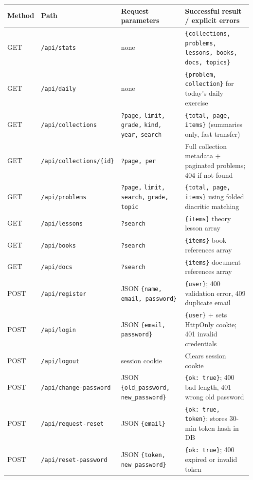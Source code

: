 \begin{table}[ht]
\centering\footnotesize
\begin{tabularx}{\textwidth}{@{}l l >{\raggedright\arraybackslash}X >{\raggedright\arraybackslash}X@{}}
\toprule
\textbf{Method} & \textbf{Path} & \textbf{Request parameters} & \textbf{Successful result / explicit errors}\\
\midrule
GET & \texttt{/api/stats} & none & \texttt{\{collections, problems, lessons, books, docs, topics\}}\\
GET & \texttt{/api/daily} & none & \texttt{\{problem, collection\}} for today's daily exercise\\
GET & \texttt{/api/collections} & \texttt{?page,} \texttt{limit,} \texttt{grade,} \texttt{kind,} \texttt{year,} \texttt{search} & \texttt{\{total, page, items\}} (summaries only, fast transfer)\\
GET & \texttt{/api/collections/\{id\}} & \texttt{?page, per} & Full collection metadata + paginated problems; 404 if not found\\
GET & \texttt{/api/problems} & \texttt{?page,} \texttt{limit,} \texttt{search,} \texttt{grade,} \texttt{topic} & \texttt{\{total, page, items\}} using folded diacritic matching\\
GET & \texttt{/api/lessons} & \texttt{?search} & \texttt{\{items\}} theory lesson array\\
GET & \texttt{/api/books} & \texttt{?search} & \texttt{\{items\}} book references array\\
GET & \texttt{/api/docs} & \texttt{?search} & \texttt{\{items\}} document references array\\
POST & \texttt{/api/register} & JSON \texttt{\{name, email, password\}} & \texttt{\{user\}}; 400 validation error, 409 duplicate email\\
POST & \texttt{/api/login} & JSON \texttt{\{email, password\}} & \texttt{\{user\}} + sets HttpOnly cookie; 401 invalid credentials\\
POST & \texttt{/api/logout} & session cookie & Clears session cookie\\
POST & \texttt{/api/change-password} & JSON \texttt{\{old\_password, new\_password\}} & \texttt{\{ok: true\}}; 400 bad length, 401 wrong old password\\
POST & \texttt{/api/request-reset} & JSON \texttt{\{email\}} & \texttt{\{ok: true, token\}}; stores 30-min token hash in DB\\
POST & \texttt{/api/reset-password} & JSON \texttt{\{token, new\_password\}} & \texttt{\{ok: true\}}; 400 expired or invalid token\\

\end{tabularx}
\end{table}

